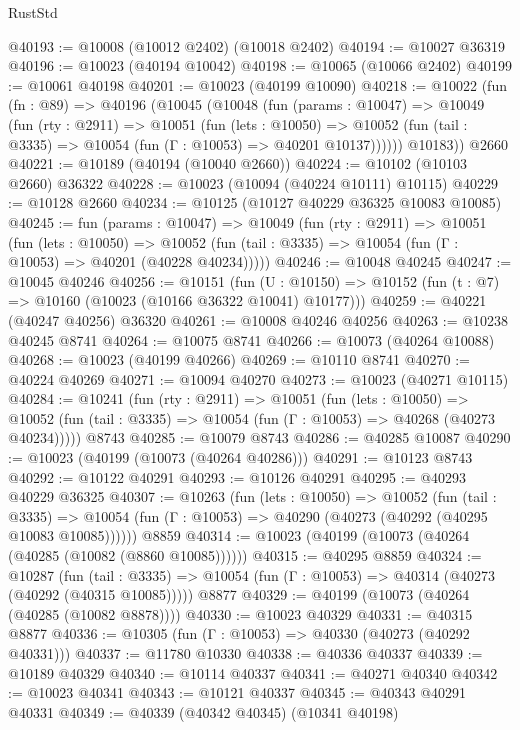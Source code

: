 \begin{lexlean}{RustStd}
\begin{coremodule}
@40193 := @10008 (@10012 @2402) (@10018 @2402)
@40194 := @10027 @36319
@40196 := @10023 (@40194 @10042)
@40198 := @10065 (@10066 @2402)
@40199 := @10061 @40198
@40201 := @10023 (@40199 @10090)
@40218 := @10022
    (fun (fn : @89) =>
    @40196
      (@10045
        (@10048
          (fun (params : @10047) =>
          @10049
            (fun (rty : @2911) =>
            @10051
              (fun (lets : @10050) =>
              @10052 (fun (tail : @3335) => @10054 (fun (Γ : @10053) => @40201 @10137))))))
        @10183))
    @2660
@40221 := @10189 (@40194 (@10040 @2660))
@40224 := @10102 (@10103 @2660) @36322
@40228 := @10023 (@10094 (@40224 @10111) @10115)
@40229 := @10128 @2660
@40234 := @10125 (@10127 @40229 @36325 @10083 @10085)
@40245 := fun (params : @10047) =>
  @10049
    (fun (rty : @2911) =>
    @10051
      (fun (lets : @10050) =>
      @10052 (fun (tail : @3335) => @10054 (fun (Γ : @10053) => @40201 (@40228 @40234)))))
@40246 := @10048 @40245
@40247 := @10045 @40246
@40256 := @10151
    (fun (U : @10150) => @10152 (fun (t : @7) => @10160 (@10023 (@10166 @36322 @10041) @10177)))
@40259 := @40221 (@40247 @40256) @36320
@40261 := @10008 @40246 @40256
@40263 := @10238 @40245 @8741
@40264 := @10075 @8741
@40266 := @10073 (@40264 @10088)
@40268 := @10023 (@40199 @40266)
@40269 := @10110 @8741
@40270 := @40224 @40269
@40271 := @10094 @40270
@40273 := @10023 (@40271 @10115)
@40284 := @10241
    (fun (rty : @2911) =>
    @10051
      (fun (lets : @10050) =>
      @10052 (fun (tail : @3335) => @10054 (fun (Γ : @10053) => @40268 (@40273 @40234)))))
    @8743
@40285 := @10079 @8743
@40286 := @40285 @10087
@40290 := @10023 (@40199 (@10073 (@40264 @40286)))
@40291 := @10123 @8743
@40292 := @10122 @40291
@40293 := @10126 @40291
@40295 := @40293 @40229 @36325
@40307 := @10263
    (fun (lets : @10050) =>
    @10052
      (fun (tail : @3335) =>
      @10054 (fun (Γ : @10053) => @40290 (@40273 (@40292 (@40295 @10083 @10085))))))
    @8859
@40314 := @10023 (@40199 (@10073 (@40264 (@40285 (@10082 (@8860 @10085))))))
@40315 := @40295 @8859
@40324 := @10287
    (fun (tail : @3335) => @10054 (fun (Γ : @10053) => @40314 (@40273 (@40292 (@40315 @10085)))))
    @8877
@40329 := @40199 (@10073 (@40264 (@40285 (@10082 @8878))))
@40330 := @10023 @40329
@40331 := @40315 @8877
@40336 := @10305 (fun (Γ : @10053) => @40330 (@40273 (@40292 @40331)))
@40337 := @11780 @10330
@40338 := @40336 @40337
@40339 := @10189 @40329
@40340 := @10114 @40337
@40341 := @40271 @40340
@40342 := @10023 @40341
@40343 := @10121 @40337
@40345 := @40343 @40291 @40331
@40349 := @40339 (@40342 @40345) (@10341 @40198)

\end{coremodule}
\end{lexlean}
